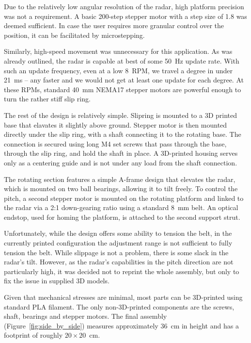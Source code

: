 Due to the relatively low angular resolution of the radar, high platform precision was not a requirement.
A basic 200-step stepper motor with a step size of 1.8 was deemed sufficient.
In case the user requires more granular control over the position, it can be facilitated by microstepping.

Similarly, high-speed movement was unnecessary for this application.
As was already outlined, the radar is capable at best of some 50~Hz update rate.
With such an update frequency, even at a low 8~RPM, we travel a degree in under 21~ms -- any faster and we would not get at least one update for each degree.
At these RPMs, standard 40~mm NEMA17 stepper motors are powerful enough to turn the rather stiff slip ring.

The rest of the design is relatively simple.
Slipring is mounted to a 3D printed base that elavates it slightly above ground.
Stepper motor is then mounted directly under the slip ring, with a shaft connecting it to the rotating base.
The connection is secured using long M4 set screws that pass through the base, through the slip ring, and hold the shaft in place.
A 3D-printed housing serves only as a centering guide and is not under any load from the shaft connection.

The rotating section features a simple A-frame design that elevates the radar, which is mounted on two ball bearings, allowing it to tilt freely.
To control the pitch, a second stepper motor is mounted on the rotating platform and linked to the radar via a 2:1 down-gearing ratio using a standard 8~mm belt.
An optical endstop, used for homing the platform, is attached to the second support strut.

Unfortunately, while the design offers some ability to tension the belt, in the currently printed configuration the adjustment range is not sufficient to fully tension the belt.
While slippage is not a problem, there is some slack in the radar's tilt.
However, as the radar's capabilities in the pitch direction are not particularly high, it was decided not to reprint the whole assembly, but only to fix the issue in supplied 3D models.

Given that mechanical stresses are minimal, most parts can be 3D-printed using standard PLA filament.
The only non-3D-printed components are the screws, shaft, bearings and stepper motors.
The final assembly (Figure~\ref{fig:side_by_side}) measures approximately 36~cm in height and has a footprint of roughly $20\times20$~cm.

